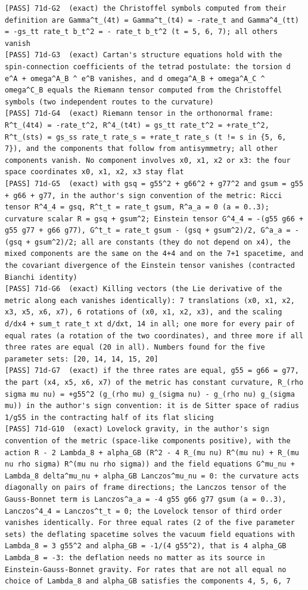 \documentclass[
  10pt,
]{article}
\begin{document}
\begin{verbatim}
[PASS] 71d-G2  (exact) the Christoffel symbols computed from their definition are Gamma^t_(4t) = Gamma^t_(t4) = -rate_t and Gamma^4_(tt) = -gs_tt rate_t b_t^2 = - rate_t b_t^2 (t = 5, 6, 7); all others vanish
[PASS] 71d-G3  (exact) Cartan's structure equations hold with the spin-connection coefficients of the tetrad postulate: the torsion d e^A + omega^A_B ^ e^B vanishes, and d omega^A_B + omega^A_C ^ omega^C_B equals the Riemann tensor computed from the Christoffel symbols (two independent routes to the curvature)
[PASS] 71d-G4  (exact) Riemann tensor in the orthonormal frame: R^t_(4t4) = -rate_t^2, R^4_(t4t) = gs_tt rate_t^2 = +rate_t^2, R^t_(sts) = gs_ss rate_t rate_s = +rate_t rate_s (t != s in {5, 6, 7}), and the components that follow from antisymmetry; all other components vanish. No component involves x0, x1, x2 or x3: the four space coordinates x0, x1, x2, x3 stay flat
[PASS] 71d-G5  (exact) with gsq = g55^2 + g66^2 + g77^2 and gsum = g55 + g66 + g77, in the author's sign convention of the metric: Ricci tensor R^4_4 = gsq, R^t_t = rate_t gsum, R^a_a = 0 (a = 0..3); curvature scalar R = gsq + gsum^2; Einstein tensor G^4_4 = -(g55 g66 + g55 g77 + g66 g77), G^t_t = rate_t gsum - (gsq + gsum^2)/2, G^a_a = -(gsq + gsum^2)/2; all are constants (they do not depend on x4), the mixed components are the same on the 4+4 and on the 7+1 spacetime, and the covariant divergence of the Einstein tensor vanishes (contracted Bianchi identity)
[PASS] 71d-G6  (exact) Killing vectors (the Lie derivative of the metric along each vanishes identically): 7 translations (x0, x1, x2, x3, x5, x6, x7), 6 rotations of (x0, x1, x2, x3), and the scaling d/dx4 + sum_t rate_t xt d/dxt, 14 in all; one more for every pair of equal rates (a rotation of the two coordinates), and three more if all three rates are equal (20 in all). Numbers found for the five parameter sets: [20, 14, 14, 15, 20]
[PASS] 71d-G7  (exact) if the three rates are equal, g55 = g66 = g77, the part (x4, x5, x6, x7) of the metric has constant curvature, R_(rho sigma mu nu) = +g55^2 (g_(rho mu) g_(sigma nu) - g_(rho nu) g_(sigma mu)) in the author's sign convention: it is de Sitter space of radius 1/g55 in the contracting half of its flat slicing
[PASS] 71d-G10  (exact) Lovelock gravity, in the author's sign convention of the metric (space-like components positive), with the action R - 2 Lambda_8 + alpha_GB (R^2 - 4 R_(mu nu) R^(mu nu) + R_(mu nu rho sigma) R^(mu nu rho sigma)) and the field equations G^mu_nu + Lambda_8 delta^mu_nu + alpha_GB Lanczos^mu_nu = 0: the curvature acts diagonally on pairs of frame directions; the Lanczos tensor of the Gauss-Bonnet term is Lanczos^a_a = -4 g55 g66 g77 gsum (a = 0..3), Lanczos^4_4 = Lanczos^t_t = 0; the Lovelock tensor of third order vanishes identically. For three equal rates (2 of the five parameter sets) the deflating spacetime solves the vacuum field equations with Lambda_8 = 3 g55^2 and alpha_GB = -1/(4 g55^2), that is 4 alpha_GB Lambda_8 = -3: the deflation needs no matter as its source in Einstein-Gauss-Bonnet gravity. For rates that are not all equal no choice of Lambda_8 and alpha_GB satisfies the components 4, 5, 6, 7

\end{verbatim}
\end{document}
